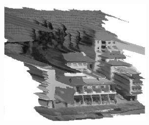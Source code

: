\begin{figure}
\begin{subfigure}[b]{0.3\textwidth}
    \caption{}
  \end{subfigure}
  ~
  \begin{subfigure}[b]{0.3\textwidth}
    \centering
    \includegraphics[width=\textwidth]{images/synthesized-view.png}
    \caption{}
  \end{subfigure}



\end{figure}
